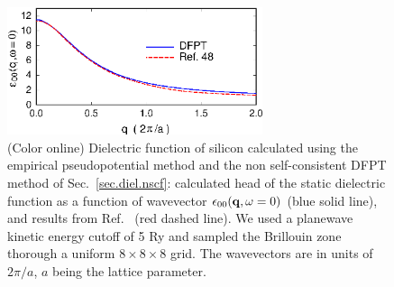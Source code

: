 \documentclass[twocolumn,prb,showpacs,superscriptaddress]{revtex4}
\def\w{\omega}
\def\q{{\bf q}}
\begin{document}
\begin  {figure}
\begin  {center}
\includegraphics[width=7.5cm]{fig1.eps}
\end    {center}
\caption{\label{fig1}
        (Color online)
        Dielectric function of silicon calculated using the empirical pseudopotential method and the
        non self-consistent DFPT method of Sec.\ \ref{sec.diel.nscf}:
        calculated head of the static dielectric function as a function of wavevector $\epsilon_{00}(\q,\w=0)$ (blue solid line),
        and results from Ref.\  (red dashed line). We used a planewave kinetic energy cutoff of 5 Ry
        and sampled the Brillouin zone thorough a uniform $8\times 8\times 8$ grid.
        The wavevectors are in units of $2\pi/a$, $a$ being the lattice parameter.
        }
\end    {figure}
\end{document}
